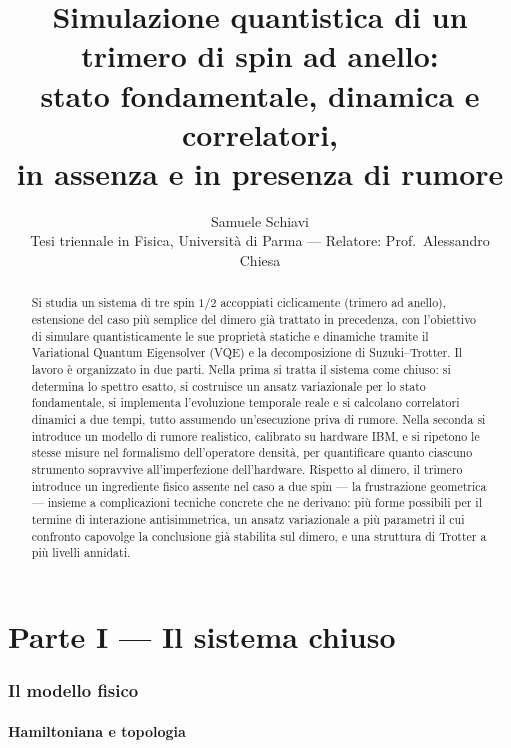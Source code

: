 \documentclass[11pt,a4paper]{article}
\title{\bfseries Simulazione quantistica di un trimero di spin ad anello:\\
stato fondamentale, dinamica e correlatori,\\
in assenza e in presenza di rumore}
\author{Samuele Schiavi \\ \small Tesi triennale in Fisica, Università di Parma
--- Relatore: Prof.\ Alessandro Chiesa}
\date{}
\begin{document}
\maketitle
\thispagestyle{fancy}

\begin{abstract}
\noindent
Si studia un sistema di tre spin $1/2$ accoppiati ciclicamente (trimero ad
anello), estensione del caso più semplice del dimero già trattato in
precedenza, con l'obiettivo di simulare quantisticamente le sue proprietà
statiche e dinamiche tramite il Variational Quantum Eigensolver (VQE) e la
decomposizione di Suzuki--Trotter. Il lavoro è organizzato in due parti.
Nella prima si tratta il sistema come chiuso: si determina lo spettro
esatto, si costruisce un ansatz variazionale per lo stato fondamentale, si
implementa l'evoluzione temporale reale e si calcolano correlatori
dinamici a due tempi, tutto assumendo un'esecuzione priva di rumore. Nella
seconda si introduce un modello di rumore realistico, calibrato su
hardware IBM, e si ripetono le stesse misure nel formalismo dell'operatore
densità, per quantificare quanto ciascuno strumento sopravvive
all'imperfezione dell'hardware. Rispetto al dimero, il trimero introduce
un ingrediente fisico assente nel caso a due spin --- la frustrazione
geometrica --- insieme a complicazioni tecniche concrete che ne derivano:
più forme possibili per il termine di interazione antisimmetrica, un
ansatz variazionale a più parametri il cui confronto capovolge la
conclusione già stabilita sul dimero, e una struttura di Trotter a più
livelli annidati.
\end{abstract}

\tableofcontents

\part*{Parte I --- Il sistema chiuso}

\section{Il modello fisico}
\label{sec:modello}

\subsection{Hamiltoniana e topologia}
\end{document}
